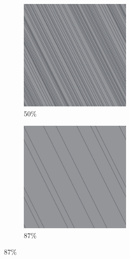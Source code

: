 \documentclass[12pt, fleqn]{report}                             %
\theoremstyle{break}                                            %
\begin{document}
\begin{figure}[ht!]
\begin{subfigure}[b]{0.4\linewidth}
          \includegraphics[width=0.6\textwidth]{Images/3/c.png}
          \caption{50\%}
        \end{subfigure}
        \begin{subfigure}[b]{0.4\linewidth}
          \includegraphics[width=0.6\textwidth]{Images/3/d.png}
          \caption{87\%}
        \end{subfigure}
      \end{figure}
\end{document}
